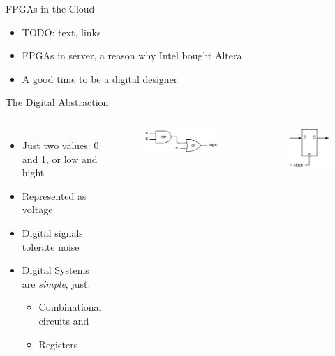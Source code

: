 \documentclass[xcolor=pdflatex,dvipsnames,table]{beamer}
\newcommand{\scale}{0.7}
\begin{document}
\begin{frame}[fragile]{FPGAs in the Cloud}
\begin{itemize}
\item TODO: text, links
\item FPGAs in server, a reason why Intel bought Altera
\item A good time to be a digital designer
\end{itemize}
\end{frame}

\begin{frame}[fragile]{The Digital Abstraction}
\begin{columns}
 
\begin{itemize}
\item Just two values: 0 and 1, or low and hight
\item Represented as voltage
\item Digital signals tolerate noise
\item Digital Systems are \emph{simple}, just:
\begin{itemize}
\item Combinational circuits and
\item Registers
\end{itemize}
\end{itemize}
 
\begin{figure}
  \includegraphics[scale=\scale]{../figures/logic}
\end{figure}
\begin{figure}
  \includegraphics[scale=\scale]{../figures/register}
\end{figure}
\end{columns}

\end{frame}
\end{document}
